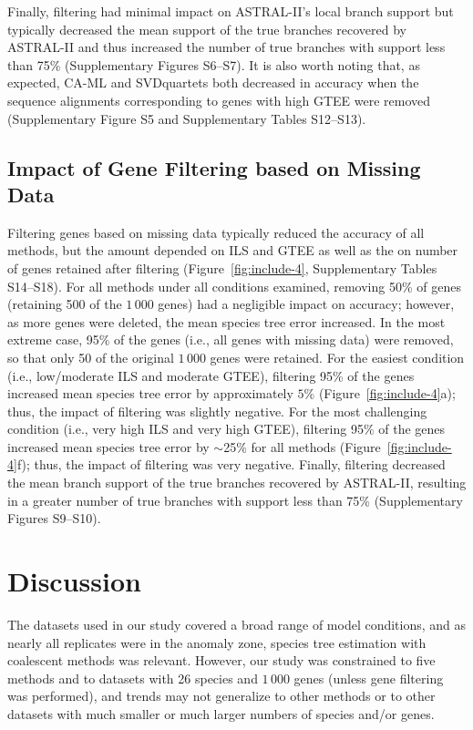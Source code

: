 Finally, filtering had minimal impact on ASTRAL-II's local branch support but typically decreased the mean support of the true branches recovered by ASTRAL-II and thus increased the number of true branches with support less than 75\% (Supplementary Figures S6--S7). 
It is also worth noting that, as expected, CA-ML and SVDquartets both decreased in accuracy when the sequence alignments corresponding to genes with high GTEE were removed (Supplementary Figure S5 and Supplementary Tables S12--S13).

\subsection{Impact of Gene Filtering based on Missing Data}
Filtering genes based on missing data typically reduced the accuracy of all methods, but the amount depended on ILS and GTEE as well as the on number of genes retained after filtering  (Figure~\ref{fig:include-4}, Supplementary Tables S14--S18). 
For all methods under all conditions examined, removing 50\% of genes (retaining 500 of the $1\,000$ genes) had a negligible impact on accuracy; however, as more genes were deleted, the mean species tree error increased. 
In the most extreme case, 95\% of the genes (i.e., all genes with missing data) were removed, so that only 50 of the original $1\,000$ genes were retained.
For the easiest condition (i.e., low/moderate ILS and moderate GTEE), filtering 95\% of the genes increased mean species tree error by approximately $5\%$ (Figure~\ref{fig:include-4}a); thus, the impact of filtering was slightly negative. 
For the most challenging condition (i.e., very high ILS and very high GTEE), filtering 95\% of the genes increased mean species tree error by $\sim$25\% for all methods (Figure~\ref{fig:include-4}f); thus, the impact of filtering was very negative. 
Finally, filtering decreased the mean branch support of the true branches recovered by ASTRAL-II, resulting in a greater number of true branches with support less than 75\% (Supplementary Figures S9--S10).

\section{Discussion}
\label{sec:include-discussion}
The datasets used in our study covered a broad range of model conditions, and as nearly all replicates were in the anomaly zone, species tree estimation with coalescent methods was relevant. 
However, our study was constrained to five methods and to datasets with 26 species and $1\,000$ genes (unless gene filtering was performed), and trends may not generalize to other methods or to other datasets with much smaller or much larger numbers of species and/or genes.

